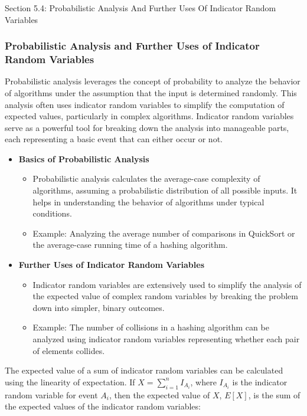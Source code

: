 \begin{notes}{Section 5.4: Probabilistic Analysis And Further Uses Of Indicator Random Variables}
    \subsubsection*{Probabilistic Analysis and Further Uses of Indicator Random Variables}

    Probabilistic analysis leverages the concept of probability to analyze the behavior of algorithms under the assumption that the input is determined randomly. This analysis often uses indicator 
    random variables to simplify the computation of expected values, particularly in complex algorithms. Indicator random variables serve as a powerful tool for breaking down the analysis into 
    manageable parts, each representing a basic event that can either occur or not.
    
    \begin{itemize}
        \item \textbf{Basics of Probabilistic Analysis}
        \begin{itemize}
            \item Probabilistic analysis calculates the average-case complexity of algorithms, assuming a probabilistic distribution of all possible inputs. It helps in understanding the behavior of 
            algorithms under typical conditions.
            \item Example: Analyzing the average number of comparisons in QuickSort or the average-case running time of a hashing algorithm.
        \end{itemize}
        
        \item \textbf{Further Uses of Indicator Random Variables}
        \begin{itemize}
            \item Indicator random variables are extensively used to simplify the analysis of the expected value of complex random variables by breaking the problem down into simpler, binary outcomes.
            \item Example: The number of collisions in a hashing algorithm can be analyzed using indicator random variables representing whether each pair of elements collides.
        \end{itemize}
    \end{itemize}
    
    \begin{highlight}
        The expected value of a sum of indicator random variables can be calculated using the linearity of expectation. If $X = \sum_{i=1}^{n} I_{A_i}$, where $I_{A_i}$ is the indicator random variable 
        for event $A_i$, then the expected value of $X$, $E[X]$, is the sum of the expected values of the indicator random variables:
    

\end{highlight}
\end{notes}
